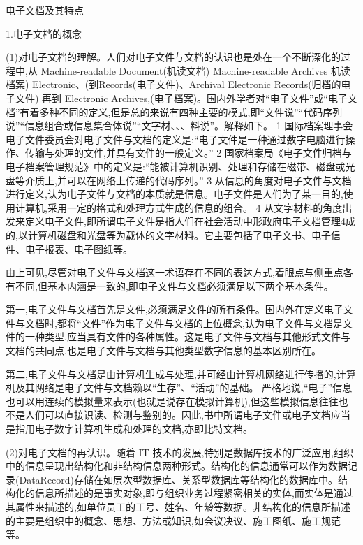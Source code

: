 电子文档及其特点

1.电子文档的概念

    (1)对电子文档的理解。人们对电子文件与文档的认识也是处在一个不断深化的过程中,从 Machine-readable Document(机读文档) Machine-readable Archives 机读档案) Electronic、(到Records(电子文件)、Archival Electronic Records(归档的电子文件) 再到 Electronic Archives,(电子档案)。国内外学者对“电子文件”或“电子文档”有着多种不同的定义,但是总的来说有四种主要的模式,即“文件说”“代码序列说”“信息组合或信息集合体说”“文字材、、、料说”。解释如下。
        1 国际档案理事会电子文件委员会对电子文件与文档的定义是:“电子文件是一种通过数字电脑进行操作、传输与处理的文件,并具有文件的一般定义。”
        2 国家档案局《电子文件归档与电子档案管理规范》中的定义是:“能被计算机识别、处理和存储在磁带、磁盘或光盘等介质上,并可以在网络上传递的代码序列。”
        3 从信息的角度对电子文件与文档进行定义,认为电子文件与文档的本质就是信息。电子文件是人们为了某一目的,使用计算机,采用一定的格式和处理方式生成的信息的组合。
        4 从文字材料的角度出发来定义电子文件,即所谓电子文件是指人们在社会活动中形政府电子文档管理4成的,以计算机磁盘和光盘等为载体的文字材料。它主要包括了电子文书、电子信件、电子报表、电子图纸等。

        由上可见,尽管对电子文件与文档这一术语存在不同的表达方式,着眼点与侧重点各有不同,但基本内涵是一致的,即电子文件与文档必须满足以下两个基本条件。

        第一,电子文件与文档首先是文件,必须满足文件的所有条件。国内外在定义电子文件与文档时,都将“文件”作为电子文件与文档的上位概念,认为电子文件与文档是文件的一种类型,应当具有文件的各种属性。这是电子文件与文档与其他形式文件与文档的共同点,也是电子文件与文档与其他类型数字信息的基本区别所在。

        第二,电子文件与文档是由计算机生成与处理,并可经由计算机网络进行传播的,计算机及其网络是电子文件与文档赖以“生存”、“活动”的基础。
        严格地说,“电子”信息也可以用连续的模拟量来表示(也就是说存在模拟计算机),但这些模拟信息往往也不是人们可以直接识读、检测与鉴别的。因此,书中所谓电子文件或电子文档应当是指用电子数字计算机生成和处理的文档,亦即比特文档。

    (2)对电子文档的再认识。随着 IT 技术的发展,特别是数据库技术的广泛应用,组织中的信息呈现出结构化和非结构信息两种形式。结构化的信息通常可以作为数据记录(DataRecord)存储在如层次型数据库、关系型数据库等结构化的数据库中。结构化的信息所描述的是事实对象,即与组织业务过程紧密相关的实体,而实体是通过其属性来描述的,如单位员工的工号、姓名、年龄等数据。非结构化的信息所描述的主要是组织中的概念、思想、方法或知识,如会议决议、施工图纸、施工规范等。

